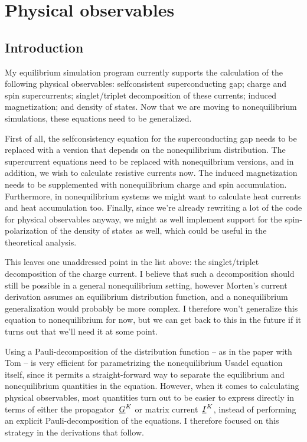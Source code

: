 \chapter{Physical observables}
\section{Introduction}
My equilibrium simulation program currently supports the calculation of the following physical observables:
  selfconsistent superconducting gap;
  charge and spin supercurrents;
  singlet/triplet decomposition of these currents;
  induced magnetization;
  and density of states.
Now that we are moving to nonequilibrium simulations, these equations need to be generalized.

First of all, the selfconsistency equation for the superconducting gap needs to be replaced with a version that depends on the nonequilibrium distribution.
The supercurrent equations need to be replaced with nonequilbrium versions, and in addition, we wish to calculate resistive currents now.
The induced magnetization needs to be supplemented with nonequilibrium charge and spin accumulation.
Furthermore, in nonequilibrium systems we might want to calculate heat currents and heat accumulation too.
Finally, since we're already rewriting a lot of the code for physical observables anyway, we might as well implement support for the spin-polarization of the density of states as well, which could be useful in the theoretical analysis.

This leaves one unaddressed point in the list above: the singlet/triplet decomposition of the charge current.
I believe that such a decomposition should still be possible in a general nonequilibrium setting, however Morten's current derivation assumes an equilibrium distribution function, and a nonequilibrium generalization would probably be more complex.
I therefore won't generalize this equation to nonequilibrium for now, but we can get back to this in the future if it turns out that we'll need it at some point.

Using a Pauli-decomposition of the distribution function -- as in the paper with Tom -- is very efficient for parametrizing the nonequilibrium Usadel equation itself, since it permits a straight-forward way to separate the equilibrium and nonequilibrium quantities in the equation.
However, when it comes to calculating physical observables, most quantities turn out to be easier to express directly in terms of either the propagator~$\underline{G}^K$ or matrix current~$\underline{I}^K$, instead of performing an explicit Pauli-decomposition of the equations.
I therefore focused on this strategy in the derivations that follow.


